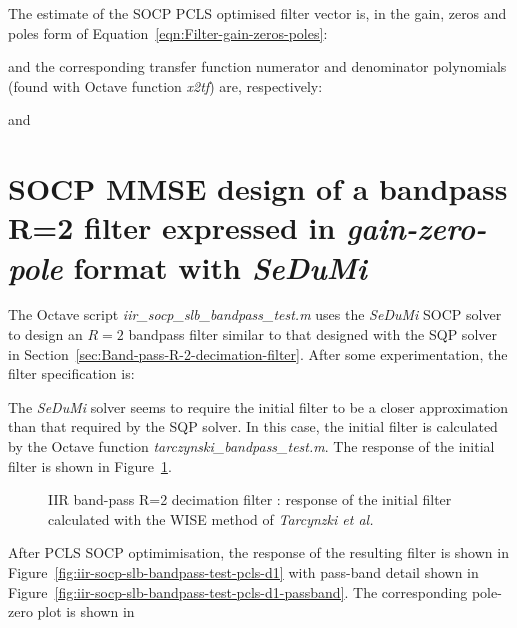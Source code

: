 \documentclass[a4paper,twoside,10pt,english]{report}
\begin{document}
The estimate of the SOCP PCLS optimised filter vector is, in the gain,
zeros and poles form of Equation~\ref{eqn:Filter-gain-zeros-poles}:
\begin{small}

\end{small}
and the corresponding transfer function numerator and denominator polynomials
(found with Octave function \emph{x2tf}) are, respectively:
\begin{small}

\end{small}
and
\begin{small}

\end{small}
\clearpage
\section{\label{sec:Bandpass-R-2-IIR-filter-gain-zero-pole-with-SeDuMi}SOCP MMSE design of a bandpass R=2 filter expressed in \emph{gain-zero-pole} format with \emph{SeDuMi}}
The Octave script \emph{iir\_socp\_slb\_bandpass\_test.m} uses the \emph{SeDuMi}
SOCP solver to design an $R=2$ bandpass filter similar to that designed with the
SQP solver in Section~\ref{sec:Band-pass-R-2-decimation-filter}. After some 
experimentation, the filter specification is:
\begin{small}

\end{small}
The \emph{SeDuMi} solver seems to require the initial filter to be a closer
approximation than that required by the SQP solver. In this case, the initial
filter is calculated by the Octave function \emph{tarczynski\_bandpass\_test.m}.
The response of the initial filter is shown in
Figure~\ref{fig:iir-socp-slb-bandpass-test-initial-x0}. 
\begin{figure}[!htbp]
\begin{center}
\scalebox{0.7}{}
\caption{IIR band-pass R=2 decimation filter : response of the initial filter
calculated with the WISE method of \emph{Tarcynzki et al.}}
\label{fig:iir-socp-slb-bandpass-test-initial-x0}
\end{center}
\end{figure}
After PCLS SOCP optimimisation, the response of the resulting filter is shown 
in Figure~\ref{fig:iir-socp-slb-bandpass-test-pcls-d1} with pass-band detail
shown in Figure~\ref{fig:iir-socp-slb-bandpass-test-pcls-d1-passband}. The
corresponding pole-zero plot is shown in
\end{document}

